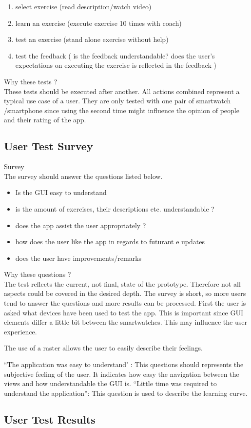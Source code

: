 \begin{enumerate}
\item select exercise (read description/watch video)
\item learn an exercise (execute exercise 10 times with coach)
\item test an exercise (stand alone exercise without help)
\item test the feedback ( is the feedback understandable? does the user's expectations on executing the exercise is reflected in the feedback )
\end{enumerate}

Why these tests ? \\
These tests should be executed after another. All actions combined represent a typical use case of a user.
They are only tested with one pair of smartwatch /smartphone since using the second time might influence the opinion of people and their rating of the app.

\subsection{User Test Survey}
Survey\\
The survey should answer the questions listed below.
\begin{itemize}
\item Is the GUI easy to understand
\item is the amount of exercises, their descriptions etc. understandable ?
\item does the app assist the user appropriately ?
\item how does the user like the app in regards to futurant e updates
\item does the user have improvements/remarks
\end{itemize}

Why these questions ?\\
The test reflects the current, not final, state of the prototype. Therefore not all aspects could be covered in the desired depth.
The survey is short, so more users tend to answer the questions and more results can be processed.
First the user is asked what devices have been used to test the app. This is important since GUI elements differ a little bit between the smartwatches. This may influence the user experience.

The use of a raster allows the user to easily describe their feelings.

“The application was easy to understand’ : This questions should represents the subjective feeling of the user. It indicates how easy the navigation between the views  and how understandable the GUI is.
“Little time was required to understand the application”: This question is used to describe the learning curve.

\subsection{User Test Results}
